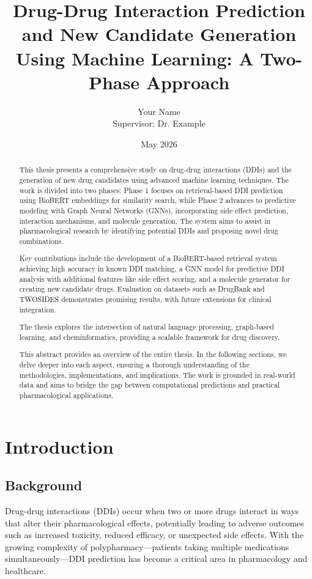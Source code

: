 \documentclass[12pt,a4paper]{article}
\title{Drug-Drug Interaction Prediction and New Candidate Generation Using Machine Learning: A Two-Phase Approach}
\author{Your Name \\ Supervisor: Dr. Example}
\date{May 2026}
\begin{document}
\maketitle

\begin{abstract}
This thesis presents a comprehensive study on drug-drug interactions (DDIs) and the generation of new drug candidates using advanced machine learning techniques. The work is divided into two phases: Phase 1 focuses on retrieval-based DDI prediction using BioBERT embeddings for similarity search, while Phase 2 advances to predictive modeling with Graph Neural Networks (GNNs), incorporating side effect prediction, interaction mechanisms, and molecule generation. The system aims to assist in pharmacological research by identifying potential DDIs and proposing novel drug combinations.

Key contributions include the development of a BioBERT-based retrieval system achieving high accuracy in known DDI matching, a GNN model for predictive DDI analysis with additional features like side effect scoring, and a molecule generator for creating new candidate drugs. Evaluation on datasets such as DrugBank and TWOSIDES demonstrates promising results, with future extensions for clinical integration.

The thesis explores the intersection of natural language processing, graph-based learning, and cheminformatics, providing a scalable framework for drug discovery.

This abstract provides an overview of the entire thesis. In the following sections, we delve deeper into each aspect, ensuring a thorough understanding of the methodologies, implementations, and implications. The work is grounded in real-world data and aims to bridge the gap between computational predictions and practical pharmacological applications.
\end{abstract}

\tableofcontents
\listoffigures
\listoftables

\section{Introduction}
\label{sec:intro}

\subsection{Background}
Drug-drug interactions (DDIs) occur when two or more drugs interact in ways that alter their pharmacological effects, potentially leading to adverse outcomes such as increased toxicity, reduced efficacy, or unexpected side effects. With the growing complexity of polypharmacy—patients taking multiple medications simultaneously—DDI prediction has become a critical area in pharmacology and healthcare.
\end{document}
